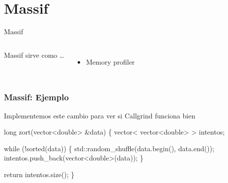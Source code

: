 \documentclass{beamer}
\begin{document}
\section{Massif}

\begin{frame}{Massif}
\begin{columns}[onlytextwidth]
  Massif sirve como \ldots
  \begin{itemize}
    \item Memory profiler
  \end{itemize}
\end{columns}
\end{frame}

\begin{frame}[fragile]
\frametitle{Massif: Ejemplo}
Implementemos este cambio para ver si Callgrind funciona bien
\begin{semiverbatim}
 \alert{ long } {\color{green}zort}(vector<double> \&data) \{
  \alert{ vector< vector<double> > intentos; }

  while (!{\color{green}sorted}(data)) \{
    std::random_shuffle(data.begin(), data.end());
    \alert{ intentos.push_back(vector<double>(data)); }
  \}

  \alert{ return intentos.size(); }
\}
\end{semiverbatim}
\end{frame}
\end{document}
